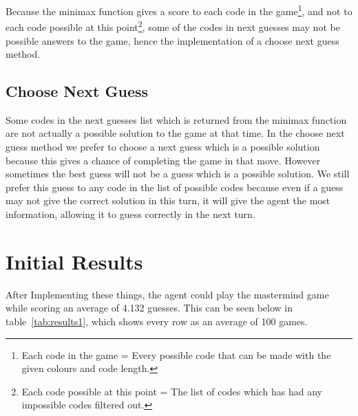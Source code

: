 \documentclass[12pt]{article}
\begin{document}

Because the minimax function gives a score to each code in the game\footnote{Each code in the game = Every possible code that can be made with the given colours and code length.}, and not to each code possible at this point\footnote{Each code possible at this point = The list of codes which has had any impossible codes filtered out.}, some of the codes in next guesses may not be possible answers to the game, hence the implementation of a choose next guess method.

\subsection{Choose Next Guess}
Some codes in the next guesses list which is returned from the minimax function are not actually a possible solution to the game at that time. In the choose next guess method we prefer to choose a next guess which is a possible solution because this gives a chance of completing the game in that move. However sometimes the best guess will not be a guess which is a possible solution. We still prefer this guess to any code in the list of possible codes because even if a guess may not give the correct solution in this turn, it will give the agent the most information, allowing it to guess correctly in the next turn. 

\section{Initial Results}
After Implementing these things, the agent could play the mastermind game while scoring an average of 4.132 guesses. This can be seen below in table~\ref{tab:results1}, which shows every row as an average of 100 games.
\end{document}
